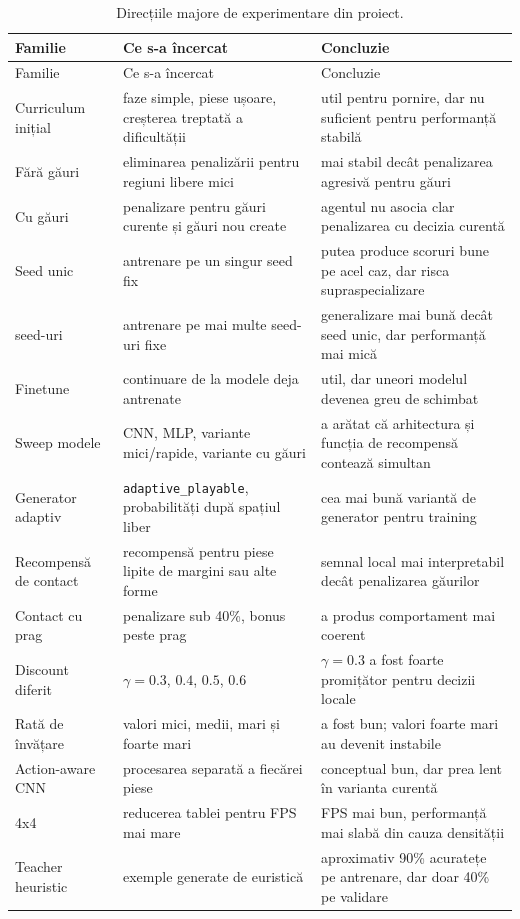 \documentclass[12pt,a4paper]{article}
\begin{document}
\begin{longtable}{>{\raggedright\arraybackslash}p{}>{\raggedright\arraybackslash}p{}>{\raggedright\arraybackslash}p{}}
    \caption{Direcțiile majore de experimentare din proiect.}
    \label{tab:experiment-families}\\
    \toprule
    Familie & Ce s-a încercat & Concluzie \\
    \midrule
    \endfirsthead
    \toprule
    Familie & Ce s-a încercat & Concluzie \\
    \midrule
    \endhead
    Curriculum inițial & faze simple, piese ușoare, creșterea treptată a dificultății & util pentru pornire, dar nu suficient pentru performanță stabilă \\
    Fără găuri & eliminarea penalizării pentru regiuni libere mici & mai stabil decât penalizarea agresivă pentru găuri \\
    Cu găuri & penalizare pentru găuri curente și găuri nou create & agentul nu asocia clar penalizarea cu decizia curentă \\
    Seed unic & antrenare pe un singur seed fix & putea produce scoruri bune pe acel caz, dar risca supraspecializare \\
    12 seed-uri & antrenare pe mai multe seed-uri fixe & generalizare mai bună decât seed unic, dar performanță mai mică \\
    Finetune & continuare de la modele deja antrenate & util, dar uneori modelul devenea greu de schimbat \\
    Sweep modele & CNN, MLP, variante mici/rapide, variante cu găuri & a arătat că arhitectura și funcția de recompensă contează simultan \\
    Generator adaptiv & \texttt{adaptive\_playable}, probabilități după spațiul liber & cea mai bună variantă de generator pentru training \\
    Recompensă de contact & recompensă pentru piese lipite de margini sau alte forme & semnal local mai interpretabil decât penalizarea găurilor \\
    Contact cu prag & penalizare sub 40\%, bonus peste prag & a produs comportament mai coerent \\
    Discount diferit & $\gamma=0.3$, $0.4$, $0.5$, $0.6$ & $\gamma=0.3$ a fost foarte promițător pentru decizii locale \\
    Rată de învățare & valori mici, medii, mari și foarte mari & 0.002 a fost bun; valori foarte mari au devenit instabile \\
    Action-aware CNN & procesarea separată a fiecărei piese & conceptual bun, dar prea lent în varianta curentă \\
    4x4 & reducerea tablei pentru FPS mai mare & FPS mai bun, performanță mai slabă din cauza densității \\
    Teacher heuristic & 150000 exemple generate de euristică & aproximativ 90\% acuratețe pe antrenare, dar doar 40\% pe validare \\
    \bottomrule
\end{longtable}
\end{document}
